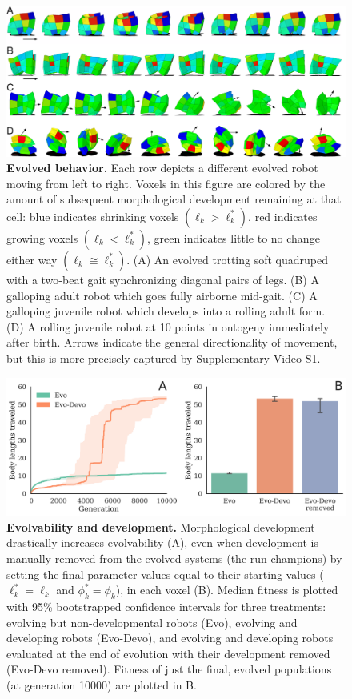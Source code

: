 \begin{figure}[t]
\includegraphics[width=\linewidth]{Chapter04/Fig2}
\caption{\label{fig:trot-gallop-roll}\textbf{Evolved behavior.}
Each row depicts a different evolved robot moving from left to right. 
Voxels in this figure are colored by the amount of subsequent morphological development remaining at that cell: blue indicates shrinking voxels $(\ell_k > \ell_k^*)$, red indicates growing voxels $(\ell_k < \ell_k^*)$, green indicates little to no change either way $(\ell_k \cong \ell_k^*)$.
(A) An evolved trotting soft quadruped with a two-beat gait synchronizing diagonal pairs of legs. 
(B) A galloping adult robot which goes fully airborne mid-gait.
(C) A galloping juvenile robot which develops into a rolling adult form. 
(D) A rolling juvenile robot at 10 points in ontogeny immediately after birth.
Arrows indicate the general directionality of movement,  
but this is more precisely captured by
Supplementary \href{https://youtu.be/Ee2sU-AZWC4}{Video S1}. 
}
\end{figure}


\begin{figure}[t]
\centering
\includegraphics[width=0.9\linewidth]{Chapter04/Fig3}
\caption{\label{fig-fitness}\textbf{Evolvability and development.} Morphological development drastically increases evolvability (A), even when development is manually removed from the evolved systems (the run champions) by setting the final parameter values equal to their starting values ($\ell_k^*=\ell_k$ and $\phi_k^*=\phi_k$), in each voxel (B).
Median fitness is plotted with 95\% bootstrapped confidence intervals for three treatments: evolving but non-developmental robots (Evo), evolving and developing robots (Evo-Devo), and evolving and developing robots evaluated at the end of evolution with their development removed (Evo-Devo removed).
Fitness of just the final, evolved populations (at generation 10000) are plotted in B.}
\end{figure}


